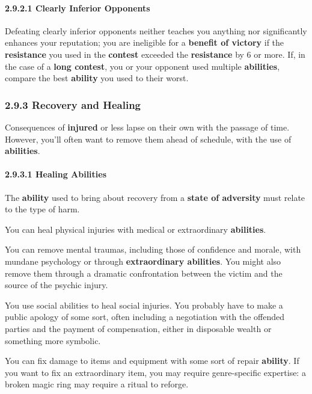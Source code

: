 \documentclass[
]{article}
\begin{document}
\hypertarget{clearly-inferior-opponents}{%
\paragraph{2.9.2.1 Clearly Inferior
Opponents}\label{clearly-inferior-opponents}}

Defeating clearly inferior opponents neither teaches you anything nor
significantly enhances your reputation; you are ineligible for a
\textbf{benefit of victory} if the \textbf{resistance} you used in the
\textbf{contest} exceeded the \textbf{resistance} by 6 or more. If, in
the case of a \textbf{long contest}, you or your opponent used multiple
\textbf{abilities}, compare the best \textbf{ability} you used to their
worst.

\hypertarget{recovery-and-healing}{%
\subsubsection{2.9.3 Recovery and Healing}\label{recovery-and-healing}}

Consequences of \textbf{injured} or less lapse on their own with the
passage of time. However, you'll often want to remove them ahead of
schedule, with the use of \textbf{abilities}.

\hypertarget{healing-abilities}{%
\paragraph{2.9.3.1 Healing Abilities}\label{healing-abilities}}

The \textbf{ability} used to bring about recovery from a \textbf{state
of adversity} must relate to the type of harm.

You can heal physical injuries with medical or extraordinary
\textbf{abilities}.

You can remove mental traumas, including those of confidence and morale,
with mundane psychology or through \textbf{extraordinary abilities}. You
might also remove them through a dramatic confrontation between the
victim and the source of the psychic injury.

You use social abilities to heal social injuries. You probably have to
make a public apology of some sort, often including a negotiation with
the offended parties and the payment of compensation, either in
disposable wealth or something more symbolic.

You can fix damage to items and equipment with some sort of repair
\textbf{ability}. If you want to fix an extraordinary item, you may
require genre-specific expertise: a broken magic ring may require a
ritual to reforge.
\end{document}
